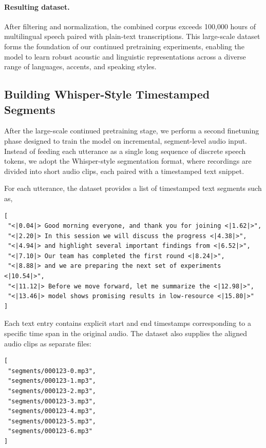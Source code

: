 \documentclass{article}
\begin{document}
\paragraph{Resulting dataset.}

After filtering and normalization, the combined corpus exceeds 100{,}000 hours of multilingual speech paired with plain-text transcriptions. This large-scale dataset forms the foundation of our continued pretraining experiments, enabling the model to learn robust acoustic and linguistic representations across a diverse range of languages, accents, and speaking styles.

\subsection{Building Whisper-Style Timestamped Segments}

After the large-scale continued pretraining stage, we perform a second finetuning phase designed to train the model on incremental, segment-level audio input. Instead of feeding each utterance as a single long sequence of discrete speech tokens, we adopt the Whisper-style segmentation format, where recordings are divided into short audio clips, each paired with a timestamped text snippet.

For each utterance, the dataset provides a list of timestamped text segments such as,

\begin{verbatim}
[
 "<|0.04|> Good morning everyone, and thank you for joining <|1.62|>",
 "<|2.20|> In this session we will discuss the progress <|4.38|>",
 "<|4.94|> and highlight several important findings from <|6.52|>",
 "<|7.10|> Our team has completed the first round <|8.24|>",
 "<|8.88|> and we are preparing the next set of experiments <|10.54|>",
 "<|11.12|> Before we move forward, let me summarize the <|12.98|>",
 "<|13.46|> model shows promising results in low-resource <|15.80|>"
]
\end{verbatim}

Each text entry contains explicit start and end timestamps corresponding to a specific time span in the original audio. The dataset also supplies the aligned audio clips as separate files:

\begin{verbatim}
[
 "segments/000123-0.mp3",
 "segments/000123-1.mp3",
 "segments/000123-2.mp3",
 "segments/000123-3.mp3",
 "segments/000123-4.mp3",
 "segments/000123-5.mp3",
 "segments/000123-6.mp3"
]
\end{verbatim}
\end{document}
